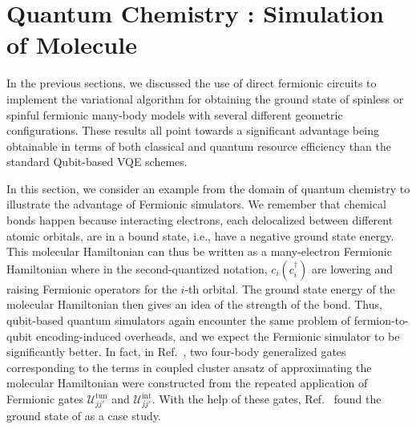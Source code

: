 \documentclass[aps, prx, reprint, superscriptaddress]{revtex4-2}
\begin{document}
\section{Quantum Chemistry : Simulation of  Molecule}
\label{sec:V}
In the previous sections, we discussed the use of direct fermionic circuits to implement the variational algorithm for obtaining the ground state of spinless or spinful fermionic many-body models with several different geometric configurations. These results all point towards a significant advantage being obtainable in terms of both classical and quantum resource efficiency than the standard Qubit-based VQE schemes.

In this section, we consider an example from the domain of quantum chemistry to illustrate the advantage of Fermionic simulators. We remember that chemical bonds happen because interacting electrons, each delocalized between different atomic orbitals, are in a bound state, i.e., have a negative ground state energy. This molecular Hamiltonian can thus be written as a many-electron Fermionic Hamiltonian where in the second-quantized notation, $c_i (c_i^{\dagger})$ are lowering and raising Fermionic operators for the $i$-th orbital. The ground state energy of the molecular Hamiltonian then gives an idea of the strength of the bond. Thus, qubit-based quantum simulators again encounter the same problem of fermion-to-qubit encoding-induced overheads, and we expect the Fermionic simulator to be significantly better. In fact, in Ref.~\cite{gonzalez2023fermionic}, two four-body generalized gates corresponding to the terms in coupled cluster ansatz of approximating the molecular Hamiltonian \cite{anand2022a} were constructed from the repeated application of Fermionic gates  $\mathcal{U}^{\text{tun}}_{jj'}$ and  $\mathcal{U}^{\text{int}}_{jj'}$. With the help of these gates, Ref.~\cite{gonzalez2023fermionic} found the ground state of  as a case study. 
\end{document}
